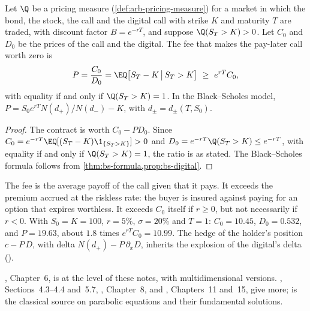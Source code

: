 \begin{proposition}\label{prop:fk-pay-later}
Let $\Q$ be a pricing measure (\cref{def:arb-pricing-measure}) for a market in which the bond, the
stock, the call and the digital call with strike $K$ and maturity $T$ are traded, with discount
factor $B=e^{-rT}$, and suppose $\Q(S_T>K)>0$. Let $C_0$ and $D_0$ be the prices of the call and
the digital. The fee that makes the pay-later call worth zero is
\[
  P=\frac{C_0}{D_0}=\EQ\big[S_T-K\,\big|\,S_T>K\big]\ \ge\ e^{rT}C_0,
\]
with equality if and only if $\Q(S_T>K)=1$. In the Black--Scholes model,
$P=S_0e^{rT}N(d_+)/N(d_-)-K$, with $d_\pm=d_\pm(T,S_0)$.
\end{proposition}

\begin{proof}
The contract is worth $C_0-PD_0$. Since $C_0=e^{-rT}\EQ[(S_T-K)\1_{\{S_T>K\}}]>0$ and
$D_0=e^{-rT}\Q(S_T>K)\le e^{-rT}$, with equality if and only if $\Q(S_T>K)=1$, the ratio is as stated.
The Black--Scholes formula follows from \cref{thm:bs-formula,prop:bs-digital}.
\end{proof}

The fee is the average payoff of the call given that it pays. It exceeds the premium accrued at
the riskless rate: the buyer is insured against paying for an option that expires worthless. It exceeds $C_0$
itself if $r\ge0$, but not necessarily if $r<0$. With $S_0=K=100$, $r=5\%$, $\sigma=20\%$ and
$T=1$: $C_0=10.45$, $D_0=0.532$, and $P=19.63$, about $1.8$ times $e^{rT}C_0=10.99$. The hedge of the
holder's position $c-P\,D$, with delta $N(d_+)-P\,\partial_xD$, inherits the explosion of the digital's
delta ().

\furtherreading
\textcite{shreve2}, Chapter~6, is at the level of these notes, with multidimensional versions.
\textcite{karatzas-shreve}, Sections~4.3--4.4 and~5.7, \textcite{oksendal}, Chapter~8, and
\textcite{steele}, Chapters~11 and~15, give more; \textcite{friedman-parabolic} is the classical
source on parabolic equations and their fundamental solutions.
